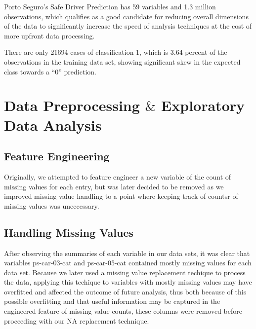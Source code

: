 \documentclass[fleqn,10pt]{SelfArx} %
\begin{document}
Porto Seguro’s Safe Driver Prediction has 59 variables and 1.3 million observations, which qualifies as a good candidate for reducing overall dimensions of the data to significantly increase the speed of analysis techniques at the cost of more upfront data processing.


There are only 21694 cases of classification 1, which is 3.64 percent of the observations in the training data set, showing significant skew in the expected class towards a ``0'' prediction.


\bigskip
\bigskip


\section{Data Preprocessing $\&$ Exploratory Data Analysis} %

\subsection{Feature Engineering}
Originally, we attempted to feature engineer a new variable of the count of missing values for each entry, but was later decided to be removed as we improved missing value handling to a point where keeping track of countsr of missing values was uneccessary.
\subsection{Handling Missing Values}

After observing the summaries of each variable in our data sets, it was clear that variables ps-car-03-cat and ps-car-05-cat contained mostly missing values for each data set. Because we later used a missing value replacement techique to process the data, applying this techique to variables with mostly missing values may have overfitted and affected the outcome of future analysis, thus both because of this possible overfitting and that useful information may be captured in the engineered feature of missing value counts, these columns were removed before proceeding with our NA replacement technique.
\end{document}
